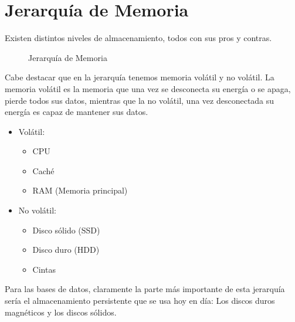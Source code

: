 \section{Jerarquía de Memoria}
Existen distintos niveles de almacenamiento, todos con sus pros y contras.

\begin{figure}[h]
  \centering
  \caption{Jerarquía de Memoria}
\end{figure}

Cabe destacar que en la jerarquía tenemos memoria volátil y no volátil. La memoria volátil es la memoria que una vez se desconecta su energía o se apaga, pierde todos sus datos, mientras que la no volátil, una vez desconectada su energía es capaz de mantener sus datos.
\begin{itemize}
  \item Volátil:
  \begin{itemize}
    \item CPU
    \item Caché
    \item RAM (Memoria principal)
  \end{itemize}
  \item No volátil:
  \begin{itemize}
    \item Disco sólido (SSD)
    \item Disco duro (HDD)
    \item Cintas
  \end{itemize}
\end{itemize}

Para las bases de datos, claramente la parte más importante de esta jerarquía sería el almacenamiento persistente que se usa hoy en día: Los discos duros magnéticos y los discos sólidos.

